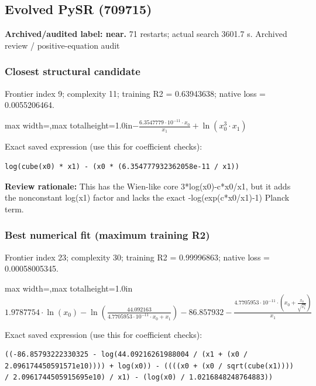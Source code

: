 \documentclass[10pt,letterpaper,landscape]{article}
\begin{document}
\begin{minipage}[t]{0.485\textwidth}
\subsection*{Evolved PySR (709715)}
\textbf{Archived/audited label: near.} 71 restarts; actual search 3601.7 s.
{\small Archived review / positive-equation audit}
\subsubsection*{Closest structural candidate}
Frontier index 9; complexity 11; training R2 = 0.63943638; native loss = 0.0055206464.
\begin{center}\begin{adjustbox}{max width=\linewidth,max totalheight=1.0in}$\displaystyle - \frac{6.3547779 \cdot 10^{-11} \cdot x_{0}}{x_{1}} + \ln{\left(x_{0}^{3} \cdot x_{1} \right)}$\end{adjustbox}\end{center}
{\scriptsize Exact saved expression (use this for coefficient checks):}
\begin{lstlisting}
log(cube(x0) * x1) - (x0 * (6.354777932362058e-11 / x1))
\end{lstlisting}
{\small\textbf{Review rationale:} This has the Wien-like core 3*log(x0)-c*x0/x1, but it adds the nonconstant log(x1) factor and lacks the exact -log(exp(c*x0/x1)-1) Planck term.}
\subsubsection*{Best numerical fit (maximum training R2)}
Frontier index 23; complexity 30; training R2 = 0.99996863; native loss = 0.00058005345.
\begin{center}\begin{adjustbox}{max width=\linewidth,max totalheight=1.0in}$\displaystyle 1.9787754 \cdot \ln{\left(x_{0} \right)} - \ln{\left(\frac{44.092163}{4.7705953 \cdot 10^{-11} \cdot x_{0} + x_{1}} \right)} - 86.857932 - \frac{4.7705953 \cdot 10^{-11} \cdot \left(x_{0} + \frac{x_{0}}{\sqrt{x_{1}^{3}}}\right)}{x_{1}}$\end{adjustbox}\end{center}
{\scriptsize Exact saved expression (use this for coefficient checks):}
\begin{lstlisting}
((-86.85793222330325 - log(44.09216261988004 / (x1 + (x0 / 2.096174450591571e10)))) + log(x0)) - ((((x0 + (x0 / sqrt(cube(x1)))) / 2.0961744505915695e10) / x1) - (log(x0) / 1.0216848248764883))
\end{lstlisting}
\end{minipage}
\clearpage{}\label{planck-10007}
\end{document}

